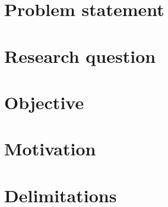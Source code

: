 \section{Problem statement}

\section{Research question}

\section{Objective}

\section{Motivation}

\section{Delimitations}

